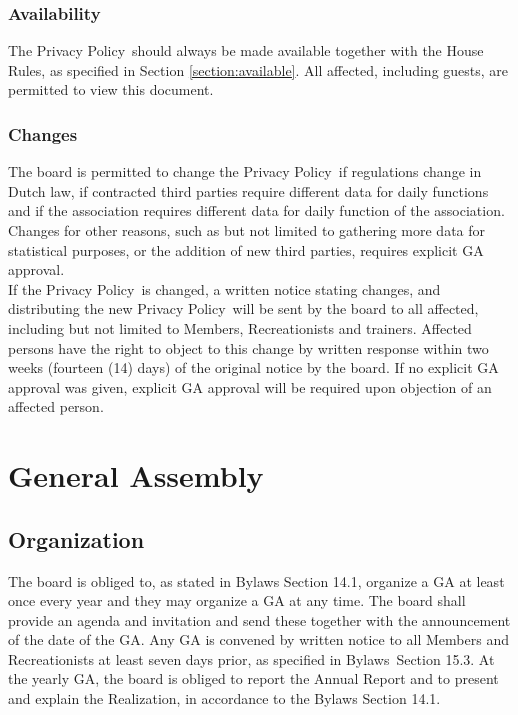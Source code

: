\documentclass[a4paper]{article}
\newcommand{\Asta}{Bylaws} %
\newcommand{\Ahr}{House Rules} %
\newcommand{\Ajv}{Annual Report} %
\newcommand{\App}{Privacy Policy}
\begin{document}
\subsubsection{Availability}
The \App\ should always be made available together with the { \Ahr}, as specified in Section \ref{section:available}. All affected, including { guests}, are permitted to view this document.

\subsubsection{Changes}
The board is permitted to change the \App\ if regulations change in Dutch law, if contracted third parties require different data for daily functions and if the association requires different data for daily function of the association. Changes for other reasons, such as but not limited to gathering more data for statistical purposes, or the addition of new third parties, requires explicit { GA} approval. \\

If the \App\ is changed, a written notice stating changes, and distributing the new \App\ will be sent by the board to all affected, including but not limited to { Members}, { Recreationists} and trainers. Affected persons have the right to object to this change by written response within two weeks (fourteen (14) days) of the original notice by the board. If no explicit { GA} approval was given, explicit { GA} approval will be required upon objection of an affected person.


\section{General Assembly}
\subsection{Organization}
\label{section:yearlyGA}
The board is obliged to, as stated in { \Asta} Section 14.1, organize a { GA} at least once every year and they may organize a { GA} at any time. The board shall provide an agenda and invitation and send these together with the announcement of the date of the { GA}. Any { GA} is convened by written notice to all { Members} and { Recreationists} at least seven days prior, as specified in \Asta\ Section 15.3. At the yearly { GA}, the board is obliged to report the { \Ajv} and to present and explain the Realization, in accordance to the { \Asta} Section 14.1. \\
\end{document}
